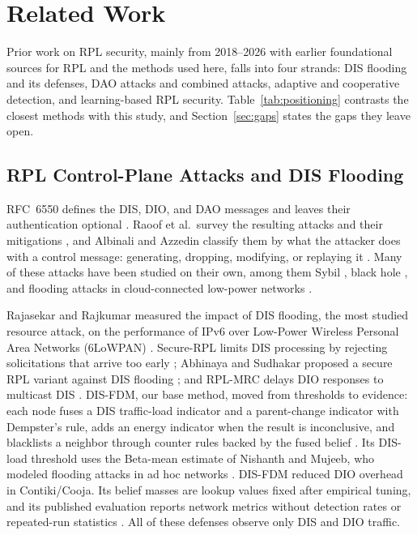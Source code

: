 \section{Related Work}\label{sec:related}
Prior work on RPL security, mainly from 2018--2026 with earlier foundational sources for RPL and the methods used here, falls into four strands: DIS flooding and its defenses, DAO attacks and combined attacks, adaptive and cooperative detection, and learning-based RPL security. Table~\ref{tab:positioning} contrasts the closest methods with this study, and Section~\ref{sec:gaps} states the gaps they leave open.

\subsection{RPL Control-Plane Attacks and DIS Flooding}
RFC~6550 defines the DIS, DIO, and DAO messages and leaves their authentication optional \cite{rfc6550}. Raoof et al.\ survey the resulting attacks and their mitigations \cite{raoof2019}, and Albinali and Azzedin classify them by what the attacker does with a control message: generating, dropping, modifying, or replaying it \cite{albinali2024}. Many of these attacks have been studied on their own, among them Sybil \cite{khan2023}, black hole \cite{sharma2022}, and flooding attacks in cloud-connected low-power networks \cite{ankam2023}.

Rajasekar and Rajkumar measured the impact of DIS flooding, the most studied resource attack, on the performance of IPv6 over Low-Power Wireless Personal Area Networks (6LoWPAN) \cite{rajasekar2022}. Secure-RPL limits DIS processing by rejecting solicitations that arrive too early \cite{vermaranga2020}; Abhinaya and Sudhakar proposed a secure RPL variant against DIS flooding \cite{abhinaya2021}; and RPL-MRC delays DIO responses to multicast DIS \cite{medjek2021}. DIS-FDM, our base method, moved from thresholds to evidence: each node fuses a DIS traffic-load indicator and a parent-change indicator with Dempster's rule, adds an energy indicator when the result is inconclusive, and blacklists a neighbor through counter rules backed by the fused belief \cite{prajisha2025}. Its DIS-load threshold uses the Beta-mean estimate of Nishanth and Mujeeb, who modeled flooding attacks in ad hoc networks \cite{nishanth2021}. DIS-FDM reduced DIO overhead in Contiki/Cooja. Its belief masses are lookup values fixed after empirical tuning, and its published evaluation reports network metrics without detection rates or repeated-run statistics \cite{prajisha2025}. All of these defenses observe only DIS and DIO traffic.

